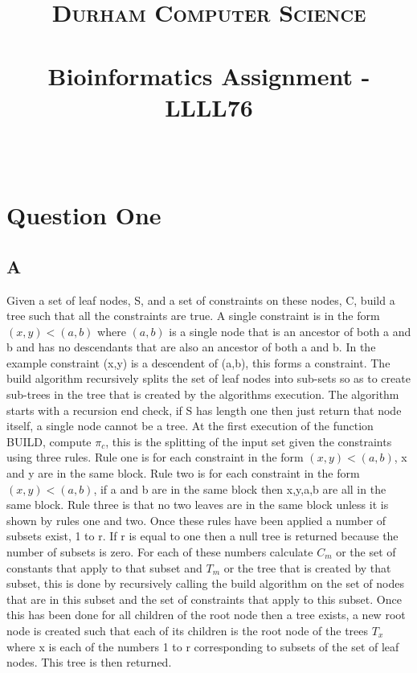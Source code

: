 \documentclass[paper=a4, fontsize=11pt]{scrartcl}
\date{}
\title{
		\vspace{-1in} 	
		\usefont{OT1}{bch}{b}{n}
		\normalfont \normalsize \textsc{Durham Computer Science} \\ [5pt]
		\horrule{0.5pt} \\[0.4cm]
		\large  Bioinformatics Assignment - LLLL76\\
		\horrule{2pt} \\[0.5cm]
		\vspace{-1in} 	
}
\numberwithin{equation}{section}		%
\numberwithin{figure}{section}			%
\numberwithin{table}{section}				%
\begin{document}
\maketitle
\section*{Question One}

\iffalse
This question is about the Build algorithm from A. V. Aho, Y. Sagiv, T. G. Szymanski, J. D. Ullman. Inferring a tree from lowest common ancestors with an application to the optimization of relational expressions. SIAM Journal on Computing
\fi

\subsection*{A}

\iffalse
Explain what the algorithm does and how it works in your own words. Do not use pseudocode
\fi

Given a set of leaf nodes, S, and a set of constraints on these nodes, C, build a tree such that all the constraints are true. A single constraint is in the form $(x, y) < (a,b)$ where $(a,b)$ is a single node that is an ancestor of both a and b and has no descendants that are also an ancestor of both a and b. In the example constraint (x,y) is a descendent of (a,b), this forms a constraint. The build algorithm recursively splits the set of leaf nodes into sub-sets so as to create sub-trees in the tree that is created by the algorithms execution. The algorithm starts with a recursion end check, if S has length one then just return that node itself, a single node cannot be a tree. At the first execution of the function BUILD, compute $\pi_c$, this is the splitting of the input set given the constraints using three rules. Rule one is for each constraint in the form $(x, y) < (a,b)$, x and y are in the same block. Rule two is for each constraint in the form $(x, y) < (a,b)$, if a and b are in the same block then x,y,a,b are all in the same block. Rule three is that no two leaves are in the same block unless it is shown by rules one and two. Once these rules have been applied a number of subsets exist, 1 to r. If r is equal to one then a null tree is returned because the number of subsets is zero. For each of these numbers calculate $C_m$ or the set of constants that apply to that subset and $T_m$ or the tree that is created by that subset, this is done by recursively calling the build algorithm on the set of nodes that are in this subset and the set of constraints that apply to this subset. Once this has been done for all children of the root node then a tree exists, a new root node is created such that each of its children is the root node of the trees $T_x$ where x is each of the numbers 1 to r corresponding to subsets of the set of leaf nodes. This tree is then returned. 
\end{document}
